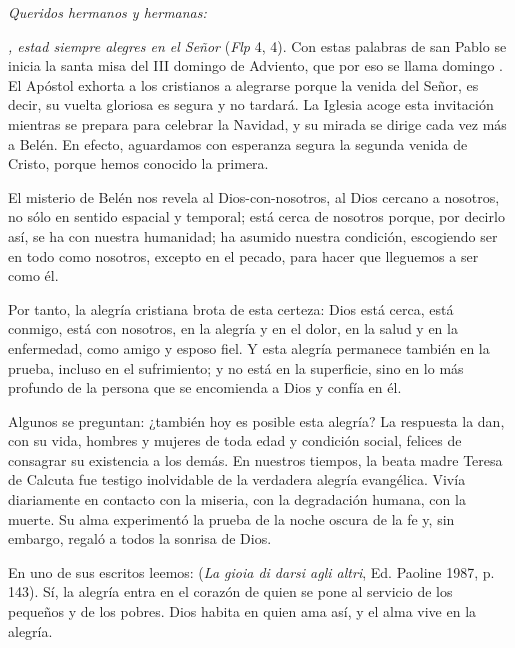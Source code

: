 				\begin{body}
					\emph{Queridos hermanos y hermanas:} 
					
					\emph{, estad siempre alegres en el Señor} (\emph{Flp} 4, 4). Con estas palabras de san Pablo se inicia la santa misa del III domingo de Adviento, que por eso se llama domingo \emph{}. El Apóstol exhorta a los cristianos a alegrarse porque la venida del Señor, es decir, su vuelta gloriosa es segura y no tardará. La Iglesia acoge esta invitación mientras se prepara para celebrar la Navidad, y su mirada se dirige cada vez más a Belén. En efecto, aguardamos con esperanza segura la segunda venida de Cristo, porque hemos conocido la primera.
					
					El misterio de Belén nos revela al Dios-con-nosotros, al Dios cercano a nosotros, no sólo en sentido espacial y temporal; está cerca de nosotros porque, por decirlo así, se ha  con nuestra humanidad; ha asumido nuestra condición, escogiendo ser en todo como nosotros, excepto en el pecado, para hacer que lleguemos a ser como él.
					
					Por tanto, la alegría cristiana brota de esta certeza: Dios está cerca, está conmigo, está con nosotros, en la alegría y en el dolor, en la salud y en la enfermedad, como amigo y esposo fiel. Y esta alegría permanece también en la prueba, incluso en el sufrimiento; y no está en la superficie, sino en lo más profundo de la persona que se encomienda a Dios y confía en él.
					
					Algunos se preguntan: ¿también hoy es posible esta alegría? La respuesta la dan, con su vida, hombres y mujeres de toda edad y condición social, felices de consagrar su existencia a los demás. En nuestros tiempos, la beata madre Teresa de Calcuta fue testigo inolvidable de la verdadera alegría evangélica. Vivía diariamente en contacto con la miseria, con la degradación humana, con la muerte. Su alma experimentó la prueba de la noche oscura de la fe y, sin embargo, regaló a todos la sonrisa de Dios.
					
					En uno de sus escritos leemos:  (\emph{La gioia di darsi agli altri}, Ed. Paoline 1987, p. 143). Sí, la alegría entra en el corazón de quien se pone al servicio de los pequeños y de los pobres. Dios habita en quien ama así, y el alma vive en la alegría.
					

\end{body}
